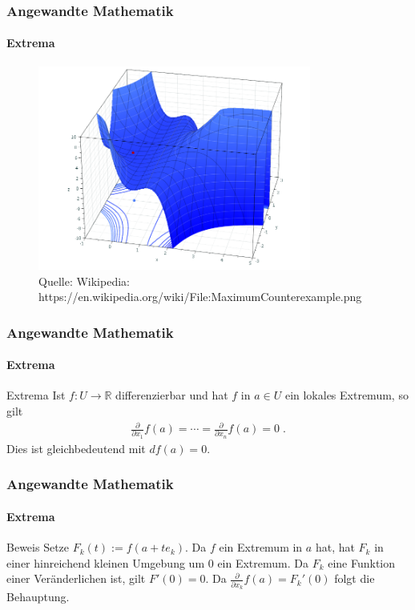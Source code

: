 \documentclass{beamer}
\begin{document}
\begin{frame}
    \frametitle{Angewandte Mathematik}
\framesubtitle{Extrema}

\begin{figure}[H]
      \centering
    \includegraphics[width=0.8\textwidth]{images/MaximumCounterexample}
      \caption{Quelle: Wikipedia: https://en.wikipedia.org/wiki/File:MaximumCounterexample.png}
\end{figure}
 \end{frame}



\begin{frame}
    \frametitle{Angewandte Mathematik}
\framesubtitle{Extrema}
    \begin{block}{Extrema}
 Ist $f: U  \to \mathbb{R}$ differenzierbar und hat  $f$ in $a \in U$ ein lokales Extremum, so gilt 
\begin{align*}
\frac{\partial}{\partial x_{1}} f(a) = \cdots  = \frac{\partial}{\partial x_{n}} f(a) = 0 \;.
\end{align*}
Dies ist gleichbedeutend mit $df(a) = 0$.
\end{block}
 \end{frame}

\begin{frame}
    \frametitle{Angewandte Mathematik}
\framesubtitle{Extrema}
    \begin{block}{Beweis}
Setze $F_k(t) := f(a + t e_k)$. Da $f$ ein Extremum in $a$ hat, hat $F_k$ in einer hinreichend kleinen Umgebung um $0$ ein Extremum. 
Da $F_k$ eine Funktion einer Veränderlichen ist, gilt $F'(0) = 0$. Da $\frac{\partial}{\partial x_k} f(a) = F_k'(0)$ folgt die Behauptung.
\end{block}
 \end{frame}
\end{document}
